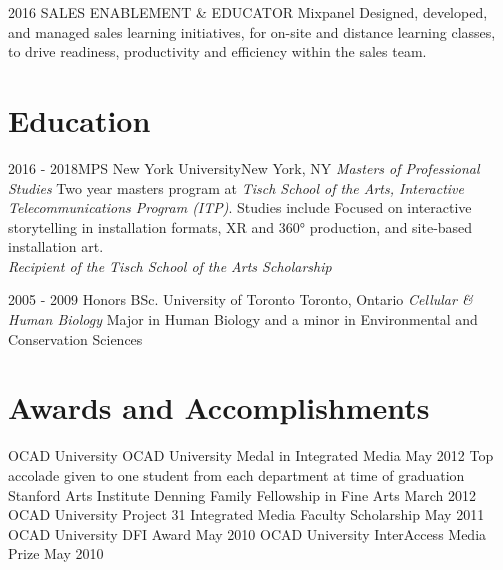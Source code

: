 \documentclass[11pt,a4paper,sans]{moderncv}   %
\begin{document}
\cventry
  {2016}
  {SALES ENABLEMENT \& EDUCATOR}
  {Mixpanel}{}
  {}{}{}
  {Designed, developed, and managed sales learning initiatives, for on-site and distance learning classes, to drive readiness, productivity and efficiency within the sales team.}
  
\section{Education}

\cventry
  {2016 - 2018}{MPS}
  {New York University}{New York, NY}
  {\textit{Masters of Professional Studies}}
  {Two year masters program at \textit{Tisch School of the Arts, Interactive Telecommunications Program (ITP)}.  Studies include Focused on interactive storytelling in installation formats, XR and
  360° production, and site-based installation art. \\\textit{Recipient of the Tisch School of the Arts Scholarship }}

\cventry
  {2005 - 2009}
  {Honors BSc.}
  {University of Toronto}
  {Toronto, Ontario}
  {\textit{Cellular \& Human Biology}}
  {Major in Human Biology and a minor in Environmental and Conservation Sciences}
\section{Awards and Accomplishments}
\cventry
  {}{OCAD University}
  {OCAD University Medal in Integrated Media}
  {May 2012}{}
  {Top accolade given to one student from each department at time of graduation}
\cventry
  {}{Stanford Arts Institute}
  {Denning Family Fellowship in Fine Arts}
  {March 2012}{}{}
\cventry
  {}{OCAD University}
  {Project 31 Integrated Media Faculty Scholarship}
  {May 2011}{}{}
\cventry
  {}{OCAD University}
  {DFI Award}
  {May 2010}{}{}
\cventry
  {}{OCAD University}
  {InterAccess Media Prize}
  {May 2010}{}{}
\end{document}
